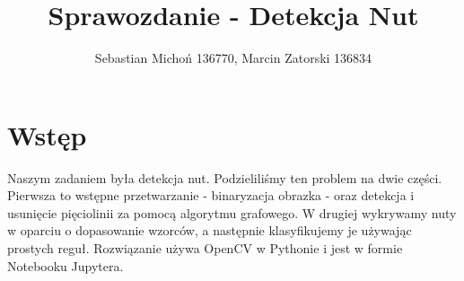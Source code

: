 \documentclass[12pt]{article}
\begin{document}
	\title{Sprawozdanie - Detekcja Nut}
	\author{Sebastian Michoń 136770, Marcin Zatorski 136834}
	\date{\vspace{-0ex}}
	\maketitle
	\section{Wstęp}
		Naszym zadaniem była detekcja nut. Podzieliliśmy ten problem na dwie części. Pierwsza to wstępne przetwarzanie - binaryzacja obrazka - oraz detekcja i usunięcie pięciolinii za pomocą algorytmu grafowego. W drugiej wykrywamy nuty w oparciu o dopasowanie wzorców, a następnie klasyfikujemy je używając prostych reguł. Rozwiązanie używa OpenCV w Pythonie i jest w formie Notebooku Jupytera.
\end{document}
